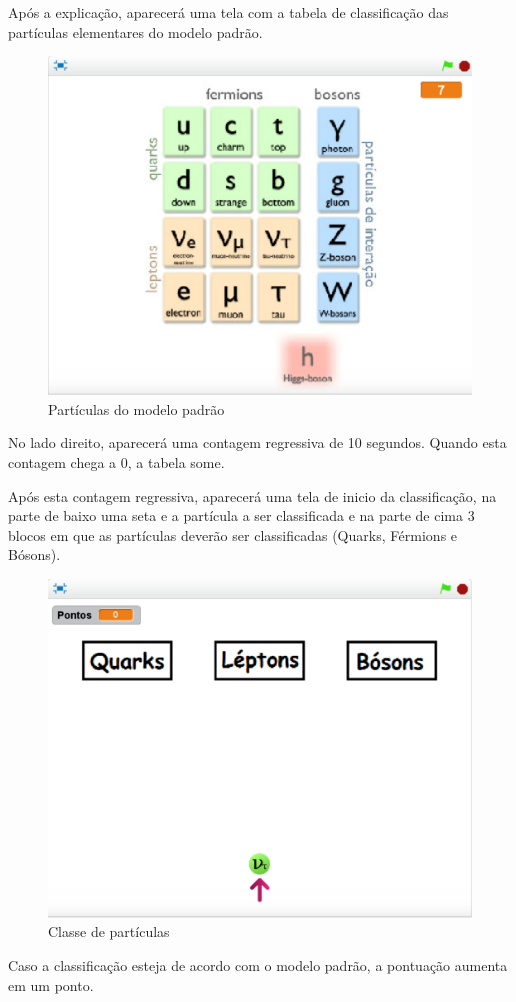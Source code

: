 \documentclass[12pt,fleqn]{book} %
\begin{document}
\newpage

Após a explicação, aparecerá uma tela com a tabela de classificação das partículas elementares do modelo padrão.

\begin{figure}[h]
	\centering
	\includegraphics[width=0.65 \textwidth]{Produto/class2}
	\caption{Partículas do modelo padrão}
	\label{fig:app_a:class2}
\end{figure}

No lado direito, aparecerá uma contagem regressiva de 10 segundos. Quando esta contagem chega a 0, a tabela some.

Após esta contagem regressiva, aparecerá uma tela de inicio da classificação, na parte de baixo uma seta e a partícula a ser classificada e na parte de cima 3 blocos em que as partículas deverão ser classificadas (Quarks, Férmions e Bósons).

\begin{figure}[h]
	\centering
	\includegraphics[width=0.63 \textwidth]{Produto/class3}
	\caption{Classe de partículas}
	\label{fig:app_a:class3}
\end{figure}

\newpage

Caso a classificação esteja de acordo com o modelo padrão, a pontuação aumenta em um ponto.
\end{document}
